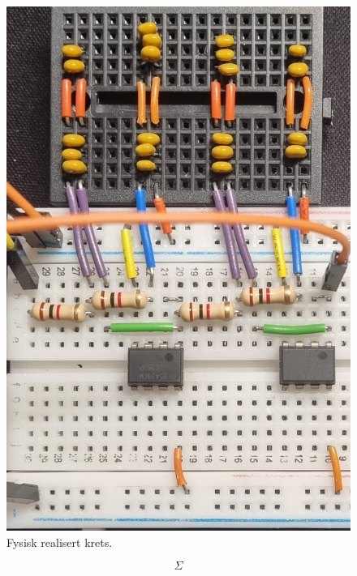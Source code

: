 \begin{figure}[!h]
	\centering
	\includegraphics[scale=0.1]{./Images/03Research/03}
	\caption{Fysisk realisert krets.}
	\label{fig:03}
\end{figure}

\begin{equation}
    \Sigma
\end{equation}